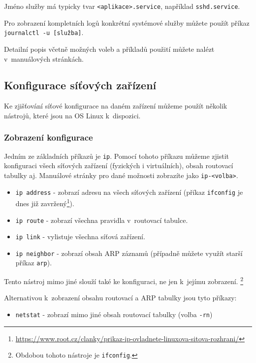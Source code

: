 Jméno služby má typicky tvar \texttt{<aplikace>.service}, například
\texttt{sshd.service}.

Pro zobrazení kompletních logů konkrétní systémové služby můžete použít příkaz
\texttt{journalctl -u [služba]}.

Detailní popis včetně možných voleb a příkladů použití můžete nalézt
v~manuálových stránkách.



\subsection{Konfigurace síťových zařízení}
\label{basic_ipconfig}
Ke zjišťování síťové konfigurace na daném zařízení můžeme použít několik nástrojů,
které jsou na OS Linux k~dispozici.

\subsubsection{Zobrazení konfigurace}
Jedním ze základních příkazů je \texttt{ip}. Pomocí tohoto příkazu můžeme zjistit
konfiguraci všech síťových zařízení (fyzických i virtuálních), obsah routovací tabulky aj. Manuálové stránky pro dané možnosti zobrazíte jako \texttt{ip-<volba>}.

\begin{itemize}
  \item \texttt{ip address} - zobrazí adresu na všech síťových zařízení (příkaz
    \texttt{ifconfig} je dnes již zavržený\footnote{\url{https://www.root.cz/clanky/prikaz-ip-ovladnete-linuxova-sitova-rozhrani/}}).
				\item \texttt{ip route} - zobrazí všechna pravidla v~routovací tabulce.
				\item \texttt{ip link} - vylistuje všechna síťová zařízení.
        \item \texttt{ip neighbor} - zobrazí obsah ARP záznamů (případně můžete
          využít starší příkaz \texttt{arp}).
\end{itemize}

Tento nástroj mimo jiné slouží také ke konfiguraci, ne jen k~jejímu zobrazení. \footnote{Obdobou tohoto nástroje je \texttt{ifconfig}.}


Alternativou k~zobrazení obsahu routovací a ARP tabulky jsou tyto příkazy:
\begin{itemize}
\item \texttt{netstat} - zobrazí mimo jiné obsah routovací tabulky (volba \texttt{-rn})
\end{itemize}

